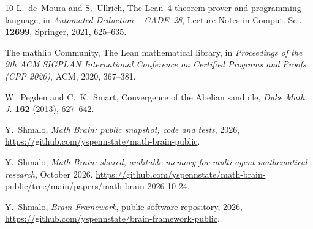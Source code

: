 \documentclass[11pt]{amsart}
\theoremstyle{remark}
\numberwithin{equation}{section}
\begin{document}
\begin{thebibliography}{10}
L.~de~Moura and S.~Ullrich, The Lean~4 theorem prover and programming language, in \emph{Automated Deduction -- CADE~28}, Lecture Notes in Comput. Sci. \textbf{12699}, Springer, 2021, 625--635.

The mathlib Community, The Lean mathematical library, in \emph{Proceedings of the 9th ACM SIGPLAN International Conference on Certified Programs and Proofs (CPP 2020)}, ACM, 2020, 367--381.

W.~Pegden and C.~K.~Smart, Convergence of the Abelian sandpile, \emph{Duke Math. J.} \textbf{162} (2013), 627--642.

 Y.~Shmalo, \emph{Math Brain: public snapshot, code and tests}, 2026, \url{https://github.com/yspennstate/math-brain-public}.

 Y.~Shmalo, \emph{Math Brain: shared, auditable memory for multi-agent mathematical research}, October 2026, \url{https://github.com/yspennstate/math-brain-public/tree/main/papers/math-brain-2026-10-24}.

 Y.~Shmalo, \emph{Brain Framework}, public software repository, 2026, \url{https://github.com/yspennstate/brain-framework-public}.

\end{thebibliography}
\end{document}
